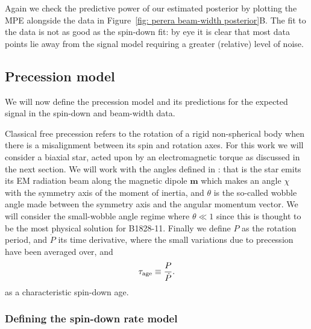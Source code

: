 \documentclass[../full_thesis/full_thesis.tex]{subfiles}
\begin{document}
Again we check the predictive power of our estimated posterior by plotting the
MPE alongside the data in Figure~\ref{fig: perera beam-width posterior}B. The fit
to the data is not as good as the spin-down fit: by eye it is clear that most
data points lie away from the signal model requiring a greater (relative) level
of noise.

\subsection{Precession model}
\label{sec: The precession model}

We will now define the precession model and its predictions for the expected
signal in the spin-down and beam-width data.

Classical free precession refers to the rotation of a rigid non-spherical body
when there is a misalignment between its spin and rotation axes. For this work
we will consider a biaxial star, acted upon by an electromagnetic torque as
discussed in the next section. We will work with the angles defined in
\citet{Jones2001}: that is the star emits its EM radiation beam along the magnetic
dipole $\mathbf{m}$ which makes an angle $\chi$ with the symmetry axis of the
moment of inertia, and $\theta$ is the so-called wobble angle made between the
symmetry axis and the angular momentum vector. We will consider the
small-wobble angle regime where $\theta \ll 1$ since this is thought to be the
most physical solution for B1828-11.  Finally we define $P$ as the rotation
period, and $\dot P$ its time derivative, where the small variations due to
precession have been averaged over, and
\begin{align}
    \tau_{\mathrm{age}} \equiv  \frac{P}{\dot P}.
\end{align}
as a characteristic spin-down age.

\subsubsection{Defining the spin-down rate model}
\end{document}
